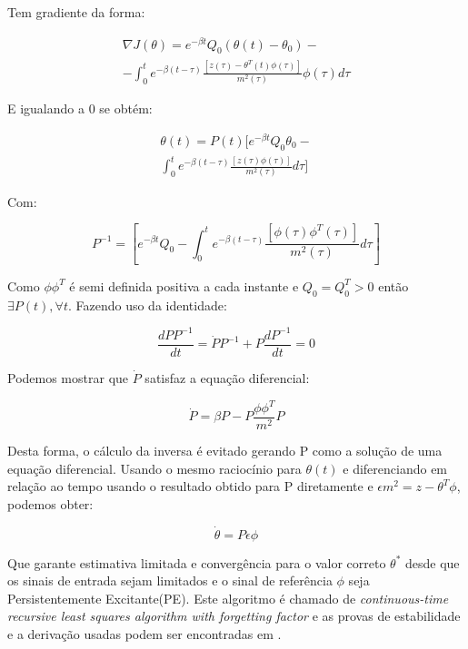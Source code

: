 \documentclass[conference,harvard,brazil,english]{sbatex}
\begin{document}
Tem gradiente da forma:

\begin{equation}
\begin{array}{r}
\nabla J(\theta) = e^{-\beta t}Q_0 (\theta(t)-\theta_0) - \\
                    -\int_{0}^t e^{-\beta(t - \tau)} \frac{[z(\tau) - \theta^T(t)\phi(\tau)]}{m^2(\tau)}\phi(\tau) d\tau
\end{array}
\end{equation}

E igualando a 0 se obtém:

\begin{equation}
\begin{array}{l}
\theta(t) = P(t)[e^{-\beta t}Q_0 \theta_0 -\\
                 \int_{0}^t e^{-\beta(t - \tau)}\frac{[z(\tau)\phi(\tau)]}{m^2(\tau)} d\tau]         
\end{array}
\end{equation}

Com:

\begin{equation}
P^{-1} = [e^{-\beta t}Q_0 - \int_{0}^t e^{-\beta(t - \tau)}\frac{[\phi(\tau)\phi^T(\tau)]}{m^2(\tau)} d\tau]   
\end{equation}

Como $\phi\phi^T$ é semi definida positiva a cada instante e $Q_0 = Q_0^T >0$ então $\exists P(t), \forall t$. Fazendo uso da identidade:

\begin{equation}
\frac{d PP^{-1}}{dt} = \dot{P}P^{-1} + P\frac{d P^{-1}}{dt} = 0
\end{equation}

Podemos mostrar que $\dot{P}$ satisfaz a equação diferencial:

\begin{equation}
 \dot{P} = \beta P - P\frac{\phi \phi^T}{m^2}P
\end{equation}

Desta forma, o cálculo da inversa é evitado gerando P como a solução de uma equação diferencial. Usando o mesmo raciocínio para $\theta(t)$ e diferenciando em relação ao tempo usando o resultado obtido para P diretamente e $\epsilon m^2 = z- \theta^T \phi$, podemos obter:

\begin{equation}
\dot{\theta} = P\epsilon \phi
\end{equation}

Que garante estimativa limitada e convergência para o valor correto $\theta^*$ desde que os sinais de entrada sejam limitados e o sinal de referência $\phi$ seja Persistentemente Excitante(PE). Este algoritmo é chamado de \emph{continuous-time recursive least squares algorithm with forgetting factor} e as provas de estabilidade e a derivação usadas podem ser encontradas em \cite{ioannou2}.
\end{document}
